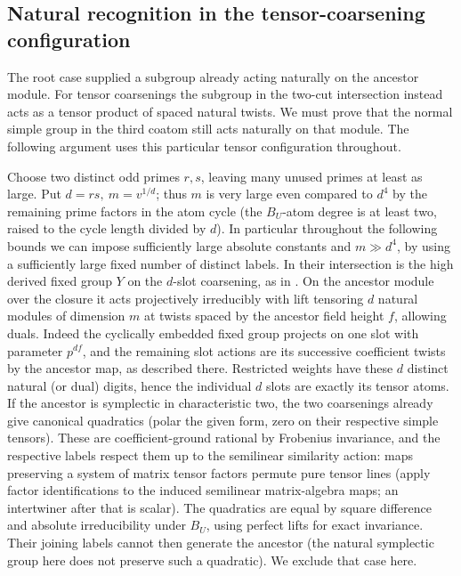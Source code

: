 \subsection{Natural recognition in the tensor-coarsening configuration}\label{fb:tensor-configuration}
The root case supplied a subgroup already acting naturally on the
ancestor module.  For tensor coarsenings the subgroup in the two-cut
intersection instead acts as a tensor product of spaced natural twists.
We must prove that the normal simple group in the third coatom still
acts naturally on that module.  The following argument uses this
particular tensor configuration throughout.

Choose two distinct odd primes \(r,s\), leaving many unused primes at least as large. Put \(d=rs,\ m=v^{1/d}\); thus \(m\) is very large even compared to \(d^4\) by the remaining prime factors in the atom cycle (the \(B_U\)-atom degree is at least two, raised to the cycle length divided by \(d\)). In particular throughout the following bounds we can impose sufficiently large absolute constants and \(m\gg d^4\), by using a sufficiently large fixed number of distinct labels. In their intersection is the high derived fixed group \(Y\) on the \(d\)-slot coarsening, as in . On the ancestor module over the closure it acts projectively irreducibly with lift tensoring \(d\) natural modules of dimension \(m\) at twists spaced by the ancestor field height \(f\), allowing duals. Indeed the cyclically embedded fixed group projects on one slot with parameter \(p^{df}\), and the remaining slot actions are its successive coefficient twists by the ancestor map, as described there. Restricted weights have these \(d\) distinct natural (or dual) digits, hence the individual \(d\) slots are exactly its tensor atoms. If the ancestor is symplectic in characteristic two, the two coarsenings already give canonical quadratics (polar the given form, zero on their respective simple tensors). These are coefficient-ground rational by Frobenius invariance, and the respective labels respect them up to the semilinear similarity action: maps preserving a system of matrix tensor factors permute pure tensor lines (apply factor identifications to the induced semilinear matrix-algebra maps; an intertwiner after that is scalar). The quadratics are equal by square difference and absolute irreducibility under \(B_U\), using perfect lifts for exact invariance. Their joining labels cannot then generate the ancestor (the natural symplectic group here does not preserve such a quadratic). We exclude that case here.

